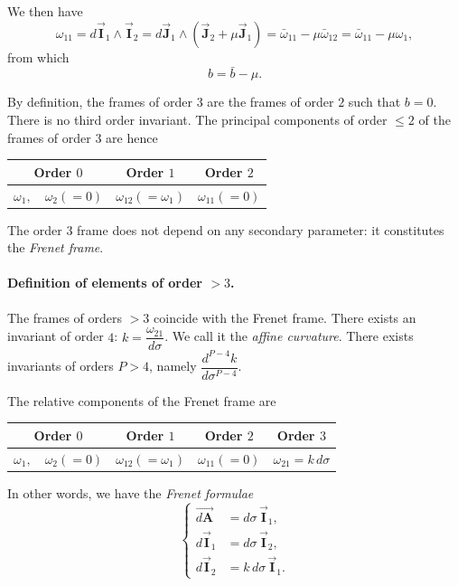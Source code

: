 \documentclass[leqno,11pt]{book}
\numberwithin{equation}{chapter}
\theoremstyle{shape1}
\theoremstyle{shapesmall}
\newcommand{\rvec}[1]{\vec{\mathbf{#1}}}
\newcommand{\ivec}{\rvec{I}}
\newcommand{\jvec}{\rvec{J}}
\begin{document}
We then have
\[
\omega_{11}=d\ivec_{1}\wedge\ivec_{2}=d\jvec_{1}\wedge(\jvec_{2}+\mu\jvec_{1})=\bar\omega_{11}-\mu\bar\omega_{12}=\bar\omega_{11}-\mu\omega_{1},
\]
from which
\[
b=\bar b-\mu.
\]

By definition, the frames of order $3$ are the frames of order $2$ such that $b=0$. There is no third order invariant. The principal components of order $\le 2$ of the frames of order $3$ are hence
 \begin{center}  
\begin{tabular}{|c|c|c|}
  \hline
  Order $0$&Order $1$&Order $2$\\
  \hline
  $\omega_{1},\quad\omega_{2}(=0)$&$\omega_{12}(=\omega_{1})$&$\omega_{11}(=0)$\\
  \hline
\end{tabular}
\end{center}

The order $3$ frame does not depend on any secondary parameter: it constitutes the \emph{Frenet frame}.


\paragraph{Definition of elements of order $>3$.}
\label{sec:137}
The frames of orders $>3$ coincide with the Frenet frame. There exists an invariant of order $4$: $k=\dfrac{\omega_{21}}{d\sigma}$. We call it the \emph{affine curvature}. There exists invariants of orders $P>4$, namely $\dfrac{d^{P-4}k}{d\sigma^{P-4}}$.

The relative components of the Frenet frame are
 \begin{center}  
\begin{tabular}{|c|c|c|c|}
  \hline
  Order $0$&Order $1$&Order $2$&Order $3$\\
  \hline
  $\omega_{1},\quad\omega_{2}(=0)$&$\omega_{12}(=\omega_{1})$&$\omega_{11}(=0)$&$\omega_{21}=k\,d\sigma$\\
  \hline
\end{tabular}
\end{center}

In other words, we have the \emph{Frenet formulae}
\begin{equation}
  \label{eq:10.2.8}
  \left\{
    \begin{aligned}
      \overrightarrow{d\mathbf{A}}&=d\sigma\,\ivec_{1},\\
      d\ivec_{1}&=d\sigma\,\ivec_{2},\\
      d\ivec_{2}&=k\,d\sigma\,\ivec_{1}.
    \end{aligned}
  \right.
\end{equation}
\end{document}
